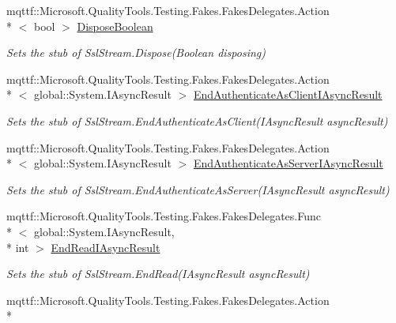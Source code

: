 \begin{DoxyCompactItemize}
mqttf\-::\-Microsoft.\-Quality\-Tools.\-Testing.\-Fakes.\-Fakes\-Delegates.\-Action\\*
$<$ bool $>$ \hyperlink{class_system_1_1_net_1_1_security_1_1_fakes_1_1_stub_ssl_stream_a7f17859e8292238c0d0ddc8c57f39191}{Dispose\-Boolean}
\begin{DoxyCompactList}\small\item\em Sets the stub of Ssl\-Stream.\-Dispose(\-Boolean disposing)\end{DoxyCompactList}\item 
mqttf\-::\-Microsoft.\-Quality\-Tools.\-Testing.\-Fakes.\-Fakes\-Delegates.\-Action\\*
$<$ global\-::\-System.\-I\-Async\-Result $>$ \hyperlink{class_system_1_1_net_1_1_security_1_1_fakes_1_1_stub_ssl_stream_a4ecb4c84310b5fae70065f9f807f60ce}{End\-Authenticate\-As\-Client\-I\-Async\-Result}
\begin{DoxyCompactList}\small\item\em Sets the stub of Ssl\-Stream.\-End\-Authenticate\-As\-Client(\-I\-Async\-Result async\-Result)\end{DoxyCompactList}\item 
mqttf\-::\-Microsoft.\-Quality\-Tools.\-Testing.\-Fakes.\-Fakes\-Delegates.\-Action\\*
$<$ global\-::\-System.\-I\-Async\-Result $>$ \hyperlink{class_system_1_1_net_1_1_security_1_1_fakes_1_1_stub_ssl_stream_a5e33c88c059b18565982e15d6171a5b2}{End\-Authenticate\-As\-Server\-I\-Async\-Result}
\begin{DoxyCompactList}\small\item\em Sets the stub of Ssl\-Stream.\-End\-Authenticate\-As\-Server(\-I\-Async\-Result async\-Result)\end{DoxyCompactList}\item 
mqttf\-::\-Microsoft.\-Quality\-Tools.\-Testing.\-Fakes.\-Fakes\-Delegates.\-Func\\*
$<$ global\-::\-System.\-I\-Async\-Result, \\*
int $>$ \hyperlink{class_system_1_1_net_1_1_security_1_1_fakes_1_1_stub_ssl_stream_a7d31bee3f66d6e49630e14015d50f30d}{End\-Read\-I\-Async\-Result}
\begin{DoxyCompactList}\small\item\em Sets the stub of Ssl\-Stream.\-End\-Read(\-I\-Async\-Result async\-Result)\end{DoxyCompactList}\item 
mqttf\-::\-Microsoft.\-Quality\-Tools.\-Testing.\-Fakes.\-Fakes\-Delegates.\-Action\\*

\end{DoxyCompactItemize}
